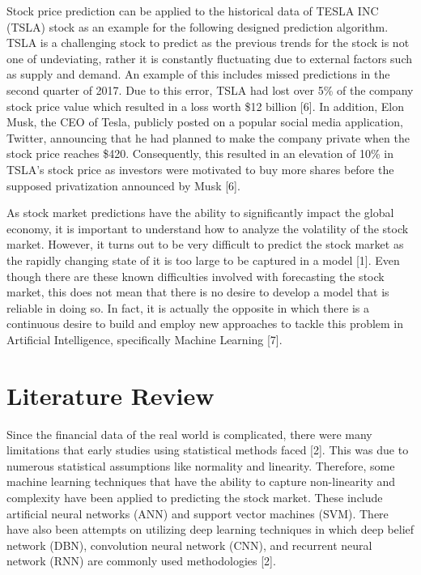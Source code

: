 \documentclass[12pt,a4paper]{article}
\begin{document}
Stock price prediction can be applied to the historical data of TESLA INC (TSLA) stock as an example for the following designed prediction algorithm. TSLA is a challenging stock to predict as the previous trends for the stock is not one of undeviating, rather it is constantly fluctuating due to external factors such as supply and demand. An example of this includes missed predictions in the second quarter of 2017. Due to this error, TSLA had lost over 5\% of the company stock price value which resulted in a loss worth \$12 billion [6]. In addition, Elon Musk, the CEO of Tesla, publicly posted on a popular social media application, Twitter, announcing that he had planned to make the company private when the stock price reaches \$420. Consequently, this resulted in an elevation of 10\% in TSLA’s stock price as investors were motivated to buy more shares before the supposed privatization announced by Musk [6]. 

As stock market predictions have the ability to significantly impact the global economy, it is important to understand how to analyze the volatility of the stock market. However, it turns out to be very difficult to predict the stock market as the rapidly changing state of it is too large to be captured in a model [1]. Even though there are these known difficulties involved with forecasting the stock market, this does not mean that there is no desire to develop a model that is reliable in doing so. In fact, it is actually the opposite in which there is a continuous desire to build and employ new approaches to tackle this problem in Artificial Intelligence, specifically Machine Learning [7]. 

\section{Literature Review}
Since the financial data of the real world is complicated, there were many limitations that early studies using statistical methods faced [2]. This was due to numerous statistical assumptions like normality and linearity. Therefore, some machine learning techniques that have the ability to capture non-linearity and complexity have been applied to predicting the stock market. These include artificial neural networks (ANN) and support vector machines (SVM). There have also been attempts on utilizing deep learning techniques in which deep belief network (DBN), convolution neural network (CNN), and recurrent neural network (RNN) are commonly used methodologies [2]. 
\end{document}
